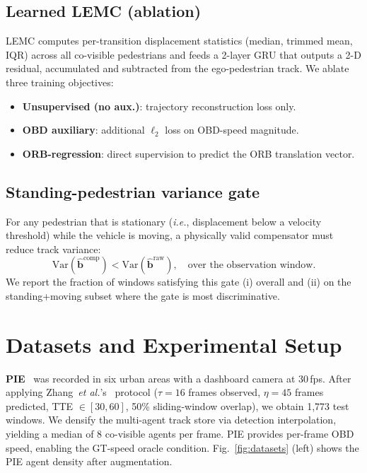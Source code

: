 \documentclass[conference]{IEEEtran}
\newcommand{\ie}{\textit{i.e.}}
\begin{document}
\subsection{Learned LEMC (ablation)}
\label{sec:lemc_method}
LEMC computes per-transition displacement statistics (median, trimmed mean, IQR) across all co-visible pedestrians and feeds a 2-layer GRU that outputs a 2-D residual, accumulated and subtracted from the ego-pedestrian track.
We ablate three training objectives:
\begin{itemize}[leftmargin=1.2em,itemsep=1pt,topsep=2pt]
  \item \textbf{Unsupervised (no aux.)}: trajectory reconstruction loss only.
  \item \textbf{OBD auxiliary}: additional $\ell_2$ loss on OBD-speed magnitude.
  \item \textbf{ORB-regression}: direct supervision to predict the ORB translation vector.
\end{itemize}

\subsection{Standing-pedestrian variance gate}
\label{sec:gate_method}
For any pedestrian that is stationary (\ie, displacement below a velocity threshold) while the vehicle is moving, a physically valid compensator must reduce track variance:
\begin{equation}
  \mathrm{Var}\!\left(\hat{\mathbf{b}}^{\text{comp}}\right) < \mathrm{Var}\!\left(\hat{\mathbf{b}}^{\text{raw}}\right), \quad \text{over the observation window}.
\end{equation}
We report the fraction of windows satisfying this gate (i) overall and (ii) on the standing+moving subset where the gate is most discriminative.

\FloatBarrier

\section{Datasets and Experimental Setup}
\label{sec:setup}

\textbf{PIE}~\cite{rasouli2019pie} was recorded in six urban areas with a dashboard camera at 30\,fps.
After applying Zhang~\textit{et al.}'s~\cite{zhang2024decouple} protocol ($\tau{=}16$ frames observed, $\eta{=}45$ frames predicted, TTE $\in[30,60]$, 50\% sliding-window overlap), we obtain 1,773 test windows.
We densify the multi-agent track store via detection interpolation, yielding a median of 8 co-visible agents per frame.
PIE provides per-frame OBD speed, enabling the GT-speed oracle condition.
Fig.~\ref{fig:datasets} (left) shows the PIE agent density after augmentation.
\end{document}
